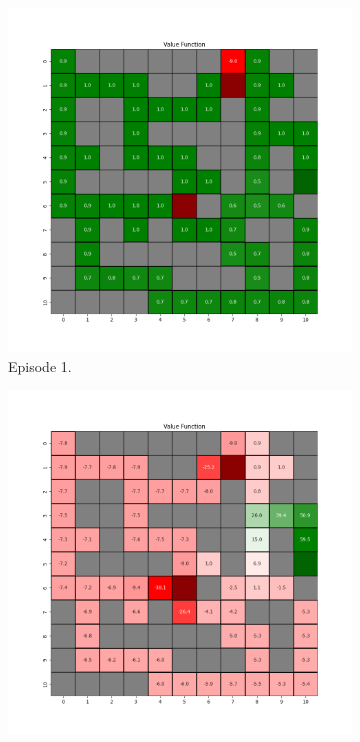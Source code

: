 \documentclass{assignment}
\begin{document}
\begin{figure}[H]
    \begin{subfigure}{0.3\textwidth}
        \includegraphics[width=\textwidth]{figures/value_td/epsilon_sweep/value_function_alpha_0.1_gamma_0.95_epsilon_0.0_iteration_1.png}
    \caption{Episode 1.}
    \end{subfigure}\hfill
    \begin{subfigure}{0.3\textwidth}
        \includegraphics[width=\textwidth]{figures/value_td/epsilon_sweep/value_function_alpha_0.1_gamma_0.95_epsilon_0.0_iteration_50.png}

\end{subfigure}
\end{figure}
\end{document}
